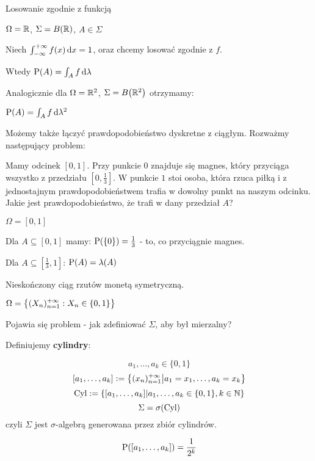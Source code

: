 \begin{example}
    Losowanie zgodnie z funkcją

    \( \Omega = \mathbb{R} \), \( \Sigma = B(\mathbb{R}) \), \( A \in \Sigma \)

    Niech \( \int_{-\infty}^{+\infty} f(x) \mathop{}\!\mathrm{d} x = 1 \), oraz chcemy losować zgodnie z \( f \).

    Wtedy \( \operatorname{P}(A) = \int_A f \mathop{}\!\mathrm{d} \lambda \) 

    Analogicznie dla \( \Omega = \mathbb{R}^2 \), \( \Sigma = B\pars{ \real^2 } \) otrzymamy:

    \( \operatorname{P}(A) = \int_A f \mathop{}\!\mathrm{d} \lambda^2 \)

\end{example}

\begin{example}

    Możemy także łączyć prawdopodobieństwo dyskretne z ciągłym. Rozważmy następujący problem:

    Mamy odcinek \( [0, 1] \). Przy punkcie \( 0 \) znajduje się magnes, który przyciąga wszystko z przedziału \( [0, \frac{1}{3}] \). W punkcie \( 1 \) stoi osoba, która rzuca piłką i z jednostajnym prawdopodobieństwem trafia w dowolny punkt na naszym odcinku. Jakie jest prawdopodobieństwo, że trafi w dany przedział \( A \)?

    \( \Omega = [0, 1] \)

    Dla \( A \subseteq [0, 1] \) mamy: \( \prob\pars{\{0\}} = \frac{1}{3} \) - to, co przyciągnie magnes.

    Dla \( A \subseteq [\frac{1}{3}, 1] \): \( \operatorname{P}(A) = \lambda(A) \)

\end{example}

\begin{example}
    Nieskończony ciąg rzutów monetą symetryczną.

    \( \Omega = \set{ (X_n)_{n = 1}^{+\infty} : X_n \in \{0, 1\} } \)

    Pojawia się problem - jak zdefiniować \( \Sigma \), aby był mierzalny?

    Definiujemy \textbf{cylindry}:

    \[ 
        a_1, \ldots, a_k \in \{0, 1\} 
    \]
    \[ 
        [a_1, \ldots, a_k] := \set{ (x_n)_{n=1}^{+\infty} \middle| a_1 = x_1, \ldots, a_k = x_k } 
    \]
    \[ 
        \text{Cyl} := \set{ [a_1, \ldots, a_k] \middle| a_1, \ldots, a_k \in \{0, 1\}, k \in \natural } 
    \]
    \[ 
        \Sigma = \sigma\pars{ \text{Cyl} } 
    \] 
    czyli \( \Sigma \) jest \( \sigma \)-algebrą generowana przez zbiór cylindrów.

    \[ 
        \prob\pars{ [a_1, \ldots, a_k] } = \frac{1}{2^k} 
    \]
\end{example}
